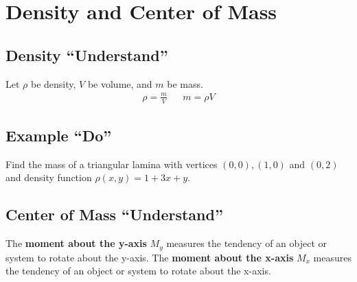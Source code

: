 \documentclass[11pt,letterpaper]{article}
\newif\ifshowsolutions
\newcommand{\sol}[1]{%
\ifshowsolutions
\par\vspace{0.3em}{\color{red}#1}\par
\fi
}
\begin{document}
\vfill


\newpage

\section{Density and Center of Mass}
\subsection{Density ``Understand''}

Let $\rho $ be density, $V$ be volume, and $m$ be mass.
\begin{align*}
    \rho= \frac{m}{V} && m=\rho V
\end{align*}

\vfill 
\sol{%
For a planar lamina with variable density $\rho(x,y)$,
\begin{align*}
    m=\iint_D \rho(x,y) \, dA.
\end{align*}
}


\subsection{Example ``Do''}
Find the mass of a triangular lamina with vertices $(0,0),(1,0)$ and $(0,2)$ and density function $\rho(x,y)=1+3x+y$.

\sol{%
\textbf{Solution.}
The hypotenuse from $(1,0)$ to $(0,2)$ is $y=2-2x$. So $0\leq x\leq 1$, $0\leq y\leq 2-2x$.
\begin{align*}
m &= \int_0^1\int_0^{2-2x}(1+3x+y)\,dy\,dx
= \int_0^1\Bigl[y+3xy+\frac{y^2}{2}\Bigr]_0^{2-2x}\,dx.
\end{align*}
Let $h=2-2x$. Then
\begin{align*}
y+3xy+\frac{y^2}{2}\Big|_0^{h}
&= h+3xh+\frac{h^2}{2}
= (2-2x)+3x(2-2x)+\frac{(2-2x)^2}{2} \\
&= 2-2x+6x-6x^2+2-4x+2x^2
= 4-4x^2.
\end{align*}
\begin{align*}
m &= \int_0^1(4-4x^2)\,dx
= \Bigl[4x-\frac{4x^3}{3}\Bigr]_0^1
= 4-\frac{4}{3}
= \frac{8}{3}.
\end{align*}
}

\vfill 
\pagebreak

\subsection{Center of Mass ``Understand''}

The \textbf{moment about the y-axis} $M_y$ measures the tendency of an object or system to rotate about the y-axis. The \textbf{moment about the x-axis} $M_x$ measures the tendency of an object or system to rotate about the x-axis.
\end{document}
